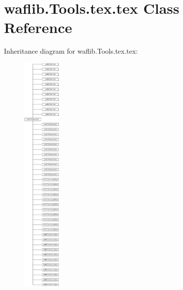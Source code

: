 \hypertarget{classwaflib_1_1_tools_1_1tex_1_1tex}{}\section{waflib.\+Tools.\+tex.\+tex Class Reference}
\label{classwaflib_1_1_tools_1_1tex_1_1tex}
Inheritance diagram for waflib.\+Tools.\+tex.\+tex\+:\begin{figure}[H]
\begin{center}
\leavevmode
\includegraphics[height=12.000000cm]{classwaflib_1_1_tools_1_1tex_1_1tex}
\end{center}
\end{figure}
